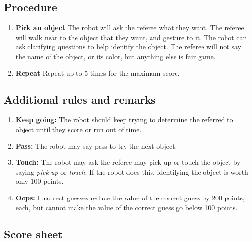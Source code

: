 %
%
\subsection{Procedure}
\begin{enumerate}
	\item \textbf{Pick an object} The robot will ask the referee what they want. The referee will walk near to the object that they want, and gesture to it. The robot can ask clarifying questions to help identify the object. The referee will not say the name of the object, or its color, but anything else is fair game.
  \item \textbf{Repeat} Repeat up to 5 times for the maximum score.


\end{enumerate}


%
%
\subsection{Additional rules and remarks}
\begin{enumerate}
	\item \textbf{Keep going:} The robot should keep trying to determine the referred to object until they score or run out of time.
	\item \textbf{Pass:} The robot may say pass to try the next object.
	\item \textbf{Touch:} The robot may ask the referee may pick up or touch the object by saying \textit{pick up} or \textit{touch}. If the robot does this, identifying the object is worth only 100 points.
	\item \textbf{Oops:} Incorrect guesses reduce the value of the correct guess by 200 points, each, but cannot make the value of the correct guess go below 100 points.

\end{enumerate}
\newpage
\subsection{Score sheet}


